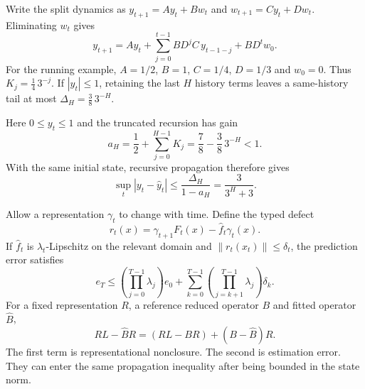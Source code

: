 \documentclass[11pt,oneside,openany]{book}
\numberwithin{equation}{section}
\begin{document}
Write the split dynamics as $y_{t+1}=Ay_t+Bw_t$ and $w_{t+1}=Cy_t+Dw_t$. Eliminating $w_t$ gives
\[
y_{t+1}=Ay_t+\sum_{j=0}^{t-1}BD^jC\,y_{t-1-j}+BD^tw_0.
\]
For the running example, $A=1/2$, $B=1$, $C=1/4$, $D=1/3$ and $w_0=0$. Thus $K_j=\tfrac14\,3^{-j}$. If $|y_t|\leq1$, retaining the last $H$ history terms leaves a same-history tail at most $\Delta_H=\tfrac38\,3^{-H}$.

Here $0\leq y_t\leq1$ and the truncated recursion has gain
\[
a_H=\frac12+\sum_{j=0}^{H-1}K_j
=\frac78-\frac38\,3^{-H}<1.
\]
With the same initial state, recursive propagation therefore gives
\[
\sup_t|y_t-\widehat y_t|\leq\frac{\Delta_H}{1-a_H}
=\frac{3}{3^H+3}.
\]

Allow a representation $\gamma_t$ to change with time. Define the typed defect
\[
r_t(x)=\gamma_{t+1}F_t(x)-\widehat f_t\gamma_t(x).
\]
If $\widehat f_t$ is $\lambda_t$-Lipschitz on the relevant domain and $\|r_t(x_t)\|\leq\delta_t$, the prediction error satisfies
\[
e_T\leq\left(\prod_{j=0}^{T-1}\lambda_j\right)e_0
+\sum_{k=0}^{T-1}\left(\prod_{j=k+1}^{T-1}\lambda_j\right)\delta_k.
\]
For a fixed representation $R$, a reference reduced operator $B$ and fitted operator $\widehat B$,
\[
RL-\widehat BR=(RL-BR)+(B-\widehat B)R.
\]
The first term is representational nonclosure. The second is estimation error. They can enter the same propagation inequality after being bounded in the state norm.
\end{document}
